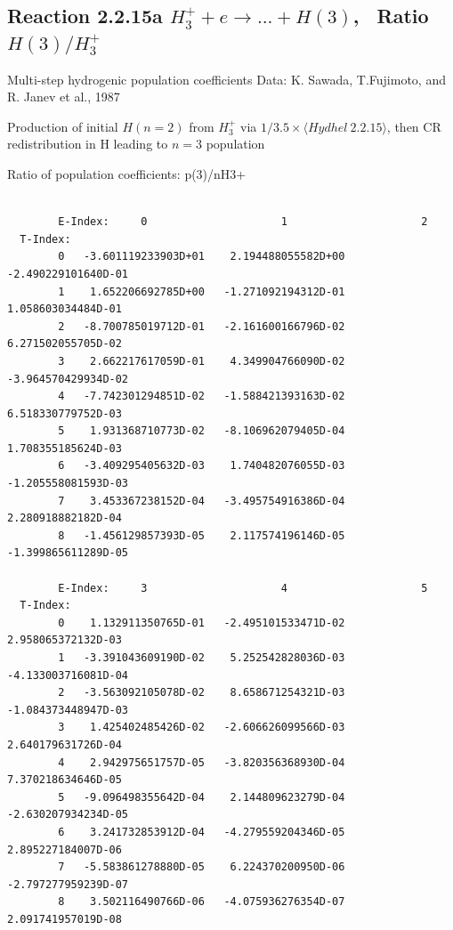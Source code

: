 \documentclass[12pt,dvipdfmx]{article}
\begin{document}
\subsection{
Reaction 2.2.15a $ H_3^+ + e \rightarrow ...+ H(3) $, \   Ratio $H(3)/H_3^+  $
}

 Multi-step hydrogenic population coefficients
 Data: K. Sawada, T.Fujimoto,  \cite{kn:Sawada} and R. Janev et al., 1987

 Production of initial $H(n=2)$ from $H_3^+$ via $1/3.5 \times \langle Hydhel~ 2.2.15\rangle$,
 then CR redistribution in H leading to $n=3$ population

 Ratio of population coefficients: p(3)/nH3+

\begin{small}\begin{verbatim}

        E-Index:     0                     1                     2
  T-Index:
        0   -3.601119233903D+01    2.194488055582D+00   -2.490229101640D-01
        1    1.652206692785D+00   -1.271092194312D-01    1.058603034484D-01
        2   -8.700785019712D-01   -2.161600166796D-02    6.271502055705D-02
        3    2.662217617059D-01    4.349904766090D-02   -3.964570429934D-02
        4   -7.742301294851D-02   -1.588421393163D-02    6.518330779752D-03
        5    1.931368710773D-02   -8.106962079405D-04    1.708355185624D-03
        6   -3.409295405632D-03    1.740482076055D-03   -1.205558081593D-03
        7    3.453367238152D-04   -3.495754916386D-04    2.280918882182D-04
        8   -1.456129857393D-05    2.117574196146D-05   -1.399865611289D-05

        E-Index:     3                     4                     5
  T-Index:
        0    1.132911350765D-01   -2.495101533471D-02    2.958065372132D-03
        1   -3.391043609190D-02    5.252542828036D-03   -4.133003716081D-04
        2   -3.563092105078D-02    8.658671254321D-03   -1.084373448947D-03
        3    1.425402485426D-02   -2.606626099566D-03    2.640179631726D-04
        4    2.942975651757D-05   -3.820356368930D-04    7.370218634646D-05
        5   -9.096498355642D-04    2.144809623279D-04   -2.630207934234D-05
        6    3.241732853912D-04   -4.279559204346D-05    2.895227184007D-06
        7   -5.583861278880D-05    6.224370200950D-06   -2.797277959239D-07
        8    3.502116490766D-06   -4.075936276354D-07    2.091741957019D-08


\end{verbatim}
\end{small}
\end{document}
